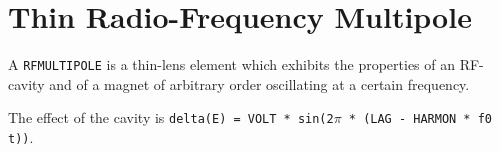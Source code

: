 \section{Thin Radio-Frequency Multipole}
\label{sec:rfmultipole}


A \texttt{RFMULTIPOLE} is a thin-lens element which exhibits the properties
of an RF-cavity and of a magnet of arbitrary order oscillating at
a certain frequency.

The effect of the cavity is \texttt{delta(E) = VOLT * sin(2$\pi$ * (LAG - HARMON *
f0 t))}. 
 
